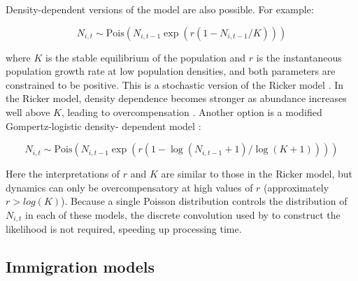 \documentclass[12pt,english]{article}
\begin{document}
\begin{spacing}{1.9}
\begin{flushleft}
Density-dependent versions of the model are also possible.  For
example:
\begin{linenomath*}
\begin{equation}
  N_{i,t} \sim \mathrm{Pois}(N_{i,t-1}\exp(r(1-N_{i,t-1}/K)))
\label{eq:rick}
\end{equation}
\end{linenomath*}
where $K$ is the stable equilibrium of the population and $r$ is
the instantaneous population growth rate at low population
densities, and both parameters are constrained to be positive. This is
a stochastic version of the 
Ricker model \citep{ricker:1954}. In the Ricker model, 
density dependence becomes stronger as abundance increases well above $K$,
leading to overcompensation    
\citep[abundance goes from above $K$ to below it;][]{sabo_etal:2004}.
Another option is a 
modified Gompertz-logistic
density-
dependent model \citep[henceforth Gompertz model;][]{gompertz:1825,
hart_gotelli:2011}:
\begin{linenomath*}
\begin{equation}
N_{i,t} \sim \mathrm{Pois}(N_{i,t-1}\exp(r(1-\log(N_{i,t-1}+1)/\log(K+1))))
\label{eq:gomp}
\end{equation}
\end{linenomath*}
Here the interpretations of $r$ and $K$ are similar to those in the
Ricker model, but dynamics can only be overcompensatory at high values of $r$
(approximately $r > log(K)$).
Because a single Poisson distribution controls
the distribution of $N_{i,t}$ in each of these models, the discrete 
convolution used by \citet{dail_madsen:2011} to construct the
likelihood is not required, speeding up processing time.

\subsection*{Immigration models}


\end{flushleft}
\end{spacing}
\end{document}
